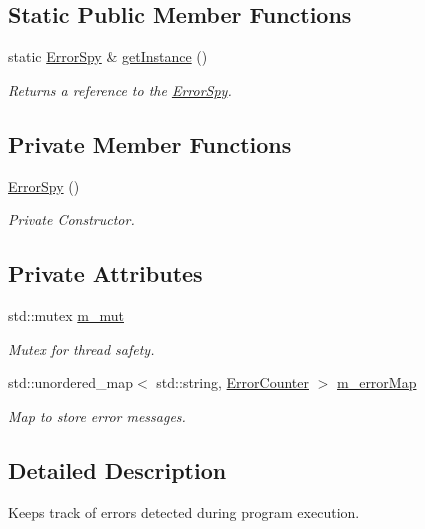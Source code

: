 \subsection*{Static Public Member Functions}
\begin{DoxyCompactItemize}
\item 
static \hyperlink{class_error_spy}{Error\+Spy} \& \hyperlink{class_error_spy_a154313e18c3c5e8bb8cba494e2eebdfd}{get\+Instance} ()
\begin{DoxyCompactList}\small\item\em Returns a reference to the \hyperlink{class_error_spy}{Error\+Spy}. \end{DoxyCompactList}\end{DoxyCompactItemize}
\subsection*{Private Member Functions}
\begin{DoxyCompactItemize}
\item 
\hyperlink{class_error_spy_a8d07ccabb00ac3925d94d77e7092bc99}{Error\+Spy} ()
\begin{DoxyCompactList}\small\item\em Private Constructor. \end{DoxyCompactList}\end{DoxyCompactItemize}
\subsection*{Private Attributes}
\begin{DoxyCompactItemize}
\item 
std\+::mutex \hyperlink{class_error_spy_ae7d03be7562c1eb3ed4de48e33d89070}{m\+\_\+mut}
\begin{DoxyCompactList}\small\item\em Mutex for thread safety. \end{DoxyCompactList}\item 
std\+::unordered\+\_\+map$<$ std\+::string, \hyperlink{class_error_counter}{Error\+Counter} $>$ \hyperlink{class_error_spy_a45fbb29e265512112996f3e94b5bff7a}{m\+\_\+error\+Map}
\begin{DoxyCompactList}\small\item\em Map to store error messages. \end{DoxyCompactList}\end{DoxyCompactItemize}


\subsection{Detailed Description}
Keeps track of errors detected during program execution. 

